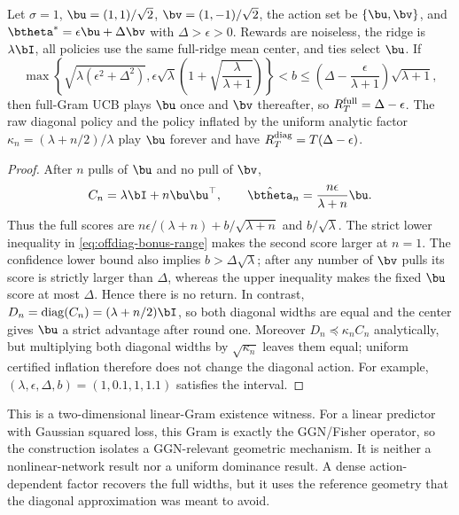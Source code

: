 \iflegacyextras
\begin{proposition}\label{prop:offdiag-witness}
Let $\sigma=1$, $\bu=(1,1)/\sqrt2$, $\bv=(1,-1)/\sqrt2$, the action set be
$\{\bu,\bv\}$, and $\btheta^*=\epsilon\bu+\Delta\bv$ with
$\Delta>\epsilon>0$.  Rewards are noiseless, the ridge is $\lambda\bI$, all
policies use the same full-ridge mean center, and ties select $\bu$.  If
\begin{equation}\label{eq:offdiag-bonus-range}
\max\!\left\{\sqrt{\lambda(\epsilon^2+\Delta^2)},
 \epsilon\sqrt\lambda\!\left(1+\sqrt{\frac\lambda{\lambda+1}}\right)\right\}
 < b\le\left(\Delta-\frac\epsilon{\lambda+1}\right)\sqrt{\lambda+1},
\end{equation}
then full-Gram UCB plays $\bu$ once and $\bv$ thereafter, so
$R_T^{\rm full}=\Delta-\epsilon$.  The raw diagonal policy and the policy
inflated by the uniform analytic factor
$\kappa_n=(\lambda+n/2)/\lambda$ play $\bu$ forever and have
$R_T^{\rm diag}=T(\Delta-\epsilon)$.
\end{proposition}
\begin{proof}
After $n$ pulls of $\bu$ and no pull of $\bv$,
\[
 C_n=\lambda\bI+n\bu\bu^\top,\qquad
 \hat\btheta_n=\frac{n\epsilon}{\lambda+n}\bu .
\]
Thus the full scores are
$n\epsilon/(\lambda+n)+b/\sqrt{\lambda+n}$ and $b/\sqrt\lambda$.
The strict lower inequality in \eqref{eq:offdiag-bonus-range} makes the second
score larger at $n=1$.  The confidence lower bound also implies
$b>\Delta\sqrt\lambda$; after any number of $\bv$ pulls its score is strictly
larger than $\Delta$, whereas the upper inequality makes the fixed $\bu$ score
at most $\Delta$.  Hence there is no return.  In contrast,
$D_n=\operatorname{diag}(C_n)=(\lambda+n/2)\bI$, so both diagonal widths are
equal and the center gives $\bu$ a strict advantage after round one.  Moreover
$D_n\preceq\kappa_nC_n$ analytically, but multiplying both diagonal widths by
$\sqrt{\kappa_n}$ leaves them equal; uniform certified inflation therefore does
not change the diagonal action.  For example,
$(\lambda,\epsilon,\Delta,b)=(1,0.1,1,1.1)$ satisfies the interval.
\end{proof}
This is a two-dimensional linear-Gram existence witness.  For a linear predictor
with Gaussian squared loss, this Gram is exactly the GGN/Fisher operator, so the
construction isolates a GGN-relevant geometric mechanism.  It is neither a
nonlinear-network result nor a uniform dominance result.  A dense action-dependent
factor recovers the full widths, but it uses the reference geometry that the
diagonal approximation was meant to avoid.
\fi

